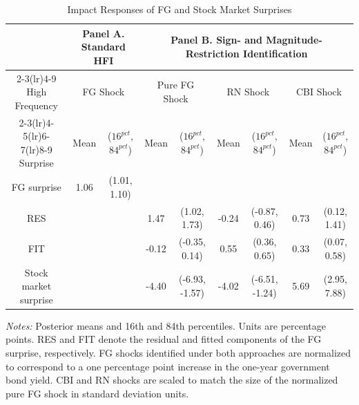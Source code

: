 \begin{table}[t]
\hypertarget{Panel AT3}{}
\hypertarget{Panel BT3}{}
\hypertarget{Table 3}{}
\begin{center}
\resizebox{16cm}{!} {
\begin{tabular}{c c c c c c c c c}
\toprule
& \multicolumn{2}{c}{Panel A. Standard HFI}
& \multicolumn{6}{c}{Panel B. Sign- and Magnitude-Restriction Identification} \\
\cmidrule(lr){2-3}\cmidrule(lr){4-9}
High Frequency
& \multicolumn{2}{c}{FG Shock}
& \multicolumn{2}{c}{Pure FG Shock}
& \multicolumn{2}{c}{RN Shock}
& \multicolumn{2}{c}{CBI Shock} \\
\cmidrule(lr){2-3}\cmidrule(lr){4-5}\cmidrule(lr){6-7}\cmidrule(lr){8-9}
Surprise
& Mean & ($16^{pct}$, $84^{pct}$)
& Mean & ($16^{pct}$, $84^{pct}$)
& Mean & ($16^{pct}$, $84^{pct}$)
& Mean & ($16^{pct}$, $84^{pct}$) \\
\midrule
FG surprise
& 1.06 & (1.01, 1.10)
&  & 
&   & 
&   &  \\
RES
&  & 
& 1.47 & (1.02, 1.73)
& -0.24 & (-0.87, 0.46)
& 0.73 & (0.12, 1.41) \\
FIT
&   & 
& -0.12 & (-0.35, 0.14)
& 0.55 & (0.36, 0.65)
& 0.33 & (0.07, 0.58) \\
Stock market surprise
&   & 
& -4.40 & (-6.93, -1.57)
& -4.02 & (-6.51, -1.24)
& 5.69 & (2.95, 7.88) \\
\bottomrule
\end{tabular}}
\caption{Impact Responses of FG and Stock Market Surprises}
\end{center}
\begin{footnotesize}
\textit{Notes:} Posterior means and 16th and 84th percentiles. Units are percentage points. RES and FIT denote the residual and fitted components of the FG surprise, respectively. FG shocks identified under both approaches are normalized to correspond to a one percentage point increase in the one-year government bond yield. CBI and RN shocks are scaled to match the size of the normalized pure FG shock in standard deviation units.
\end{footnotesize}
\end{table}
